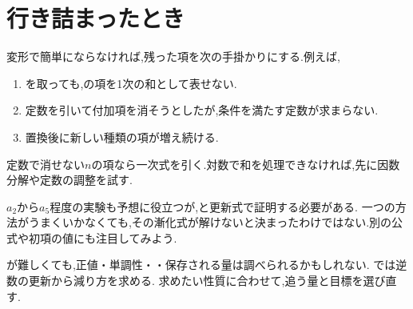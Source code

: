  \section{行き詰まったとき}\label{節：解法の変更}

  変形で簡単にならなければ,残った項を次の手掛かりにする.例えば,
  \begin{enumerate}
    \item {}を取っても,の項を1次の和として表せない.
    \item 定数を引いて付加項を消そうとしたが,条件を満たす定数が求まらない.
    \item 置換後に新しい種類の項が増え続ける.
  \end{enumerate}
  定数で消せない$n$の項なら一次式を引く.対数で和を処理できなければ,先に因数分解や定数の調整を試す.
  \BookFigFallback

  $a_2$から$a_5$程度の実験も予想に役立つが,と更新式で証明する必要がある.
  一つの方法がうまくいかなくても,その漸化式が解けないと決まったわけではない.別の公式や初項の値にも注目してみよう.

  が難しくても,正値・単調性・・保存される量は調べられるかもしれない.
  では逆数の更新から減り方を求める.
  求めたい性質に合わせて,追う量と目標を選び直す.
